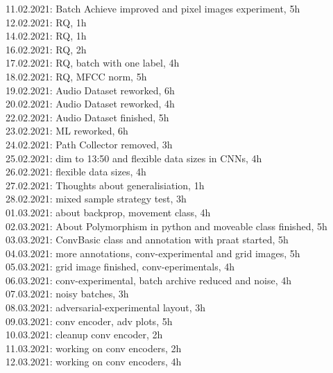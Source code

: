 11.02.2021: Batch Achieve improved and pixel images experiment, 5h\\
12.02.2021: RQ, 1h\\
14.02.2021: RQ, 1h\\

16.02.2021: RQ, 2h\\
17.02.2021: RQ, batch with one label, 4h\\
18.02.2021: RQ, MFCC norm, 5h\\

19.02.2021: Audio Dataset reworked, 6h\\
20.02.2021: Audio Dataset reworked, 4h\\


22.02.2021: Audio Dataset finished, 5h\\
23.02.2021: ML reworked, 6h\\

24.02.2021: Path Collector removed, 3h\\
25.02.2021: dim to 13:50 and flexible data sizes in CNNs, 4h\\
26.02.2021: flexible data sizes, 4h\\

27.02.2021: Thoughts about generalisiation, 1h\\
28.02.2021: mixed sample strategy test, 3h\\
01.03.2021: about backprop, movement class, 4h\\

02.03.2021: About Polymorphism in python and moveable class finished, 5h\\
03.03.2021: ConvBasic class and annotation with praat started, 5h\\

04.03.2021: more annotations, conv-experimental and grid images, 5h\\
05.03.2021: grid image finished, conv-eperimentals, 4h\\

06.03.2021: conv-experimental, batch archive reduced and noise, 4h\\
07.03.2021: noisy batches, 3h\\
08.03.2021: adversarial-experimental layout, 3h\\

09.03.2021: conv encoder, adv plots, 5h\\
10.03.2021: cleanup conv encoder, 2h\\
11.03.2021: working on conv encoders, 2h\\
12.03.2021: working on conv encoders, 4h\\

